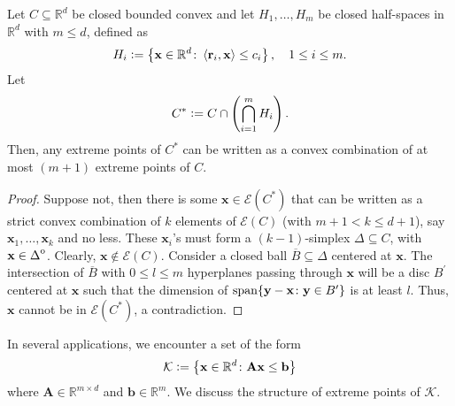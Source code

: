\begin{thm}
    Let $C \subseteq \mathbb{R}^d$ be closed bounded convex and let $H_1, \ldots, H_m$ be closed half-spaces in $\mathbb{R}^d$ with $m \leq d$, defined as
    \[
        H_i \vcentcolon= \left\{ \mathbf{x} \in \mathbb{R}^d \colon \left\langle \mathbf{r}_i, \mathbf{x} \right\rangle \leq c_i \right\}, \quad 1 \leq i \leq m.
    \]
    Let 
    \[
        C^* \vcentcolon= C \cap \left( \bigcap_{i=1}^m H_i \right).
    \]
    Then, any extreme points of $C^*$ can be written as a convex combination of at most $(m+1)$ extreme points of $C$. 
\end{thm}
\begin{proof}
    Suppose not, then there is some $\mathbf{x} \in \mathcal{E}(C^*)$ that can be written as a strict convex combination of $k$ elements of $\mathcal{E}(C)$ (with $m+1 < k \leq d+1$), say $\mathbf{x}_1, \ldots, \mathbf{x}_k$ and no less. These $\mathbf{x}_i$'s must form a $(k-1)$-simplex $\Delta \subseteq C$, with $\mathbf{x} \in {\kern0pt\Delta}^{\mathrm{o}}$. Clearly, $\mathbf{x} \notin \mathcal{E}(C)$. Consider a closed ball $\overline{B} \subseteq \Delta$ centered at $\mathbf{x}$. The intersection of $\overline{B}$ with $0 \leq l \leq m$ hyperplanes passing through $\mathbf{x}$ will be a disc $B^{\prime}$ centered at $\mathbf{x}$ such that the dimension of $\operatorname*{span}\{ \mathbf{y} - \mathbf{x} \colon \mathbf{y} \in B^{\prime} \}$ is at least $l$. Thus, $\mathbf{x}$ cannot be in $\mathcal{E}(C^*)$, a contradiction. 
\end{proof}

In several applications, we encounter a set of the form
\[
    \mathcal{K} \vcentcolon= \left\{ \mathbf{x} \in \mathbb{R}^d \colon \mathbf{Ax} \leq \mathbf{b} \right\}
\]
where $\mathbf{A} \in \mathbb{R}^{m \times d}$ and $\mathbf{b} \in \mathbb{R}^m$. We discuss the structure of extreme points of $\mathcal{K}$. 

\newpage

